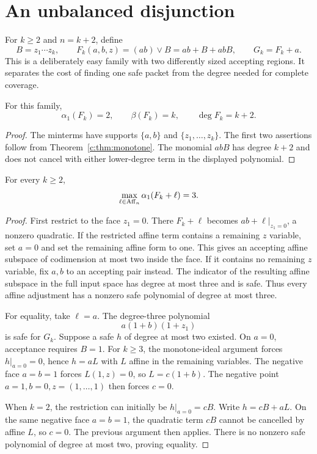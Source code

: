 \section{An unbalanced disjunction}
For $k\ge2$ and $n=k+2$, define
\[
 B=z_1\cdots z_k,\qquad
 F_k(a,b,z)=(ab)\lor B=ab+B+abB,\qquad G_k=F_k+a.
\]
This is a deliberately easy family with two differently sized accepting regions. It separates the cost of finding one safe packet from the degree needed for complete coverage.

\begin{proposition}\label{c:prop:raw-family}
For this family,
\[
 \alpha_1(F_k)=2,\qquad\beta(F_k)=k,\qquad\deg F_k=k+2.
\]
\end{proposition}
\begin{proof}
The minterms have supports $\{a,b\}$ and $\{z_1,\ldots,z_k\}$. The first two assertions follow from Theorem~\ref{c:thm:monotone}. The monomial $abB$ has degree $k+2$ and does not cancel with either lower-degree term in the displayed polynomial.
\end{proof}

\begin{theorem}\label{c:thm:family-alpha}
For every $k\ge2$,
\[
 \max_{\ell\in\operatorname{Aff}_n}\alpha_1(F_k+\ell)=3.
\]
\end{theorem}
\begin{proof}
First restrict to the face $z_1=0$. There $F_k+\ell$ becomes $ab+\ell|_{z_1=0}$, a nonzero quadratic. If the restricted affine term contains a remaining $z$ variable, set $a=0$ and set the remaining affine form to one. This gives an accepting affine subspace of codimension at most two inside the face. If it contains no remaining $z$ variable, fix $a,b$ to an accepting pair instead. The indicator of the resulting affine subspace in the full input space has degree at most three and is safe. Thus every affine adjustment has a nonzero safe polynomial of degree at most three.

For equality, take $\ell=a$. The degree-three polynomial
\[
 a(1+b)(1+z_1)
\]
is safe for $G_k$. Suppose a safe $h$ of degree at most two existed. On $a=0$, acceptance requires $B=1$. For $k\ge3$, the monotone-ideal argument forces $h|_{a=0}=0$, hence $h=aL$ with $L$ affine in the remaining variables. The negative face $a=b=1$ forces $L(1,z)=0$, so $L=c(1+b)$. The negative point $a=1,b=0,z=(1,\ldots,1)$ then forces $c=0$.

When $k=2$, the restriction can initially be $h|_{a=0}=cB$. Write $h=cB+aL$. On the same negative face $a=b=1$, the quadratic term $cB$ cannot be cancelled by affine $L$, so $c=0$. The previous argument then applies. There is no nonzero safe polynomial of degree at most two, proving equality.
\end{proof}


